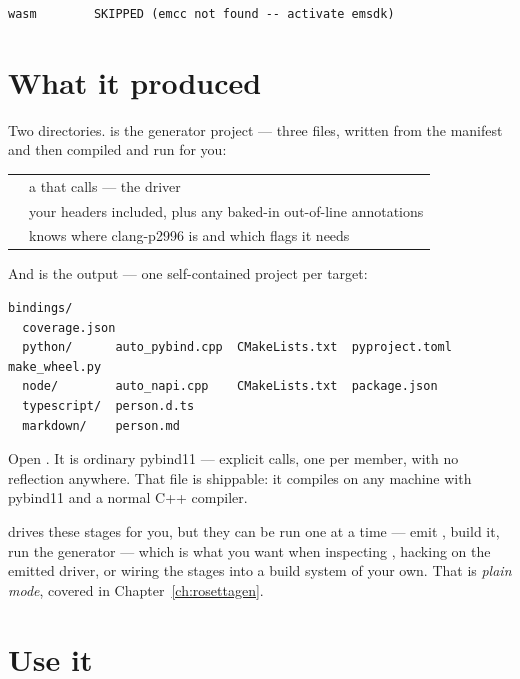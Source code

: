 \begin{lstlisting}[style=plain]
   wasm        SKIPPED (emcc not found -- activate emsdk)
\end{lstlisting}

\section{What it produced}

Two directories.  is the generator project --- three files, written
from the manifest and then compiled and run for you:

\begin{center}
\small
\begin{tabular}{@{}lL{9.2cm}@{}}
\toprule
{} & a  that calls
   --- the driver \\
 & your headers included, plus any baked-in out-of-line
  annotations \\
 & knows where clang-p2996 is and which flags it needs \\
\bottomrule
\end{tabular}
\end{center}

And  is the output --- one self-contained project per target:

\begin{lstlisting}[style=plain]
bindings/
  coverage.json
  python/      auto_pybind.cpp  CMakeLists.txt  pyproject.toml  make_wheel.py
  node/        auto_napi.cpp    CMakeLists.txt  package.json
  typescript/  person.d.ts
  markdown/    person.md
\end{lstlisting}

Open . It is ordinary pybind11 --- explicit
 calls, one per member, with no reflection anywhere. That file is
shippable: it compiles on any machine with pybind11 and a normal C++
compiler.

\begin{note}
 drives these stages for you, but they can be run one at a time
--- emit , build it, run the generator --- which is what you want
when inspecting , hacking on the emitted driver, or wiring the
stages into a build system of your own. That is \emph{plain mode}, covered in
Chapter~\ref{ch:rosettagen}.
\end{note}

\section{Use it}

